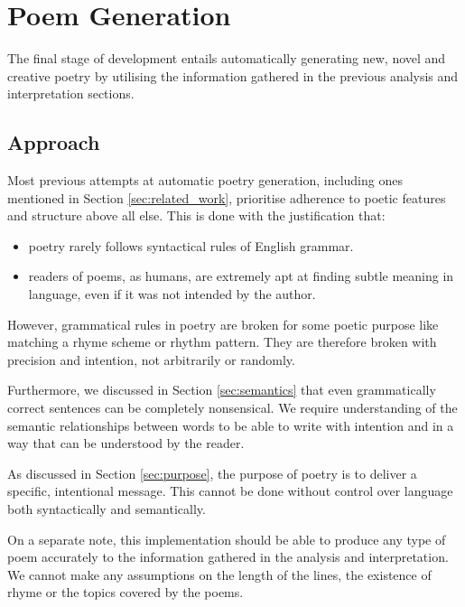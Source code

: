 \chapter{Poem Generation}
\ifpdf
    \graphicspath{{Management/ManagementFigs/PNG/}{Management/ManagementFigs/PDF/}{Management/ManagementFigs/}}
\else
    \graphicspath{{Management/ManagementFigs/EPS/}{Management/ManagementFigs/}}
\fi

The final stage of development entails automatically generating new, novel and creative poetry by utilising the information gathered in the previous analysis and interpretation sections.

\section{Approach}
Most previous attempts at automatic poetry generation, including ones mentioned in Section \ref{sec:related_work}, prioritise adherence to poetic features and structure above all else. This is done with the justification that:
\begin{itemize}
\item{poetry rarely follows syntactical rules of English grammar.}
\item{readers of poems, as humans, are extremely apt at finding subtle meaning in language, even if it was not intended by the author.}
\end{itemize}

However, grammatical rules in poetry are broken for some poetic purpose like matching a rhyme scheme or rhythm pattern. They are therefore broken with precision and intention, not arbitrarily or randomly.

Furthermore, we discussed in Section \ref{sec:semantics} that even grammatically correct sentences can be completely nonsensical. We require understanding of the semantic relationships between words to be able to write with intention and in a way that can be understood by the reader.

As discussed in Section \ref{sec:purpose}, the purpose of poetry is to deliver a specific, intentional message. This cannot be done without control over language both syntactically and semantically.

On a separate note, this implementation should be able to produce any type of poem accurately to the information gathered in the analysis and interpretation. We cannot make any assumptions on the length of the lines, the existence of rhyme or the topics covered by the poems.


